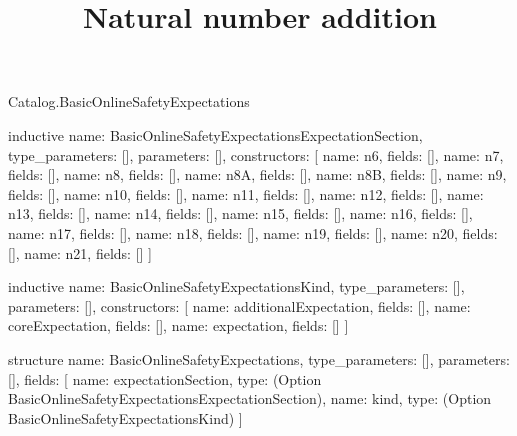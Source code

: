 \begin{lexlean}{Catalog.BasicOnlineSafetyExpectations}
\title{Natural number addition}
\begin{semanticmodule}
inductive{
  name: BasicOnlineSafetyExpectationsExpectationSection,
  type_parameters: [],
  parameters: [],
  constructors: [
    {name: n6, fields: []},
    {name: n7, fields: []},
    {name: n8, fields: []},
    {name: n8A, fields: []},
    {name: n8B, fields: []},
    {name: n9, fields: []},
    {name: n10, fields: []},
    {name: n11, fields: []},
    {name: n12, fields: []},
    {name: n13, fields: []},
    {name: n14, fields: []},
    {name: n15, fields: []},
    {name: n16, fields: []},
    {name: n17, fields: []},
    {name: n18, fields: []},
    {name: n19, fields: []},
    {name: n20, fields: []},
    {name: n21, fields: []}
  ]
}

inductive{
  name: BasicOnlineSafetyExpectationsKind,
  type_parameters: [],
  parameters: [],
  constructors: [
    {name: additionalExpectation, fields: []},
    {name: coreExpectation, fields: []},
    {name: expectation, fields: []}
  ]
}

structure{
  name: BasicOnlineSafetyExpectations,
  type_parameters: [],
  parameters: [],
  fields: [
    {name: expectationSection, type: (Option BasicOnlineSafetyExpectationsExpectationSection)},
    {name: kind, type: (Option BasicOnlineSafetyExpectationsKind)}
  ]
}
\end{semanticmodule}
\end{lexlean}
